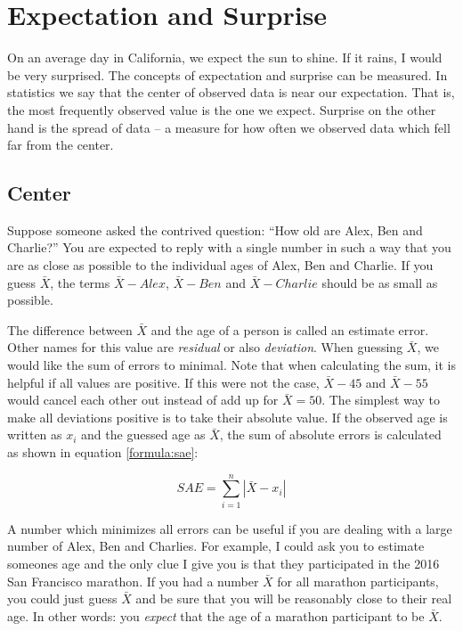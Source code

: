 \documentclass{tufte-book} %
\begin{document}
\chapter{Expectation and Surprise}
\label{ch:expectation-surprise}
On an average day in California, we expect the sun to shine. If it rains, I would be very surprised. The concepts of expectation and surprise can be measured. In statistics we say that the center of observed data is near our expectation. That is, the most frequently observed value is the one we expect. Surprise on the other hand is the spread of data -- a measure for how often we observed data which fell far from the center.

\section{Center}
Suppose someone asked the contrived question: ``How old are Alex, Ben and Charlie?'' You are expected to reply with a single number in such a way that you are as close as possible to the individual ages of Alex, Ben and Charlie. If you guess $\bar{X}$, the terms $\bar{X} - Alex$, $\bar{X} - Ben$ and $\bar{X} - Charlie$ should be as small as possible.

The difference between $\bar{X}$ and the age of a person is called an estimate error. Other names for this value are {\em residual} or also {\em deviation}. When guessing $\bar{X}$, we would like the sum of errors to minimal. Note that when calculating the sum, it is helpful if all values are positive. If this were not the case, $\bar{X} - 45$ and $\bar{X} - 55$ would cancel each other out instead of add up for $\bar{X} = 50$. The simplest way to make all deviations positive is to take their absolute value. If the observed age is written as $x_i$ and the guessed age as $\bar{X}$, the sum of absolute errors is calculated as shown in equation \ref{formula:sae}:

\begin{equation} \label{formula:sae}
	SAE = \sum_{i=1}^n |\bar{X} - x_i|
\end{equation}

A number which minimizes all errors can be useful if you are dealing with a large number of Alex, Ben and Charlies. For example, I could ask you to estimate someones age and the only clue I give you is that they participated in the 2016 San Francisco marathon. If you had a number $\bar{X}$ for all marathon participants, you could just guess $\bar{X}$ and be sure that you will be reasonably close to their real age. In other words: you {\em expect} that the age of a marathon participant to be $\bar{X}$.
\end{document}
